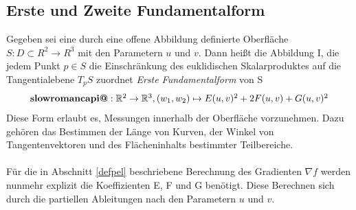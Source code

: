 \documentclass{paperStyle}
\makeatletter
\newcommand{\Rmnum}[1]{\textbf{\expandafter\@slowromancap\romannumeral #1@}}
\makeatother
\begin{document}
\subsection{Erste und Zweite Fundamentalform}
\label{fundamental}
Gegeben sei eine durch eine offene Abbildung definierte Oberfläche $S : D \subset R^{2} \longrightarrow R^{3}$ mit den Parametern $u$ und $v$. Dann heißt die Abbildung I, die jedem Punkt $p \in S$ die Einschränkung des euklidischen Skalarproduktes auf die Tangentialebene $T_{p}S$ zuordnet \textit{Erste Fundamentalform} von S
\begin{equation}
\resizebox{.9\hsize}{!}{$
\Rmnum{1}: \mathbb{R}^{2} \rightarrow \mathbb{R}^{3}, (w_{1},w_{2}) \mapsto E(u,v)^{2} + 2F(u,v) + G(u,v)^{2}$}
\end{equation}	
Diese Form erlaubt es, Messungen innerhalb der Oberfläche vorzunehmen. Dazu gehören das Bestimmen der Länge von Kurven, der Winkel von Tangentenvektoren und des Flächeninhalts bestimmter Teilbereiche.
\\
\\
Für die in Abschnitt \ref{defpel} beschriebene Berechnung des Gradienten $\nabla f$ werden nunmehr explizit die Koeffizienten E, F und G benötigt. Diese Berechnen sich durch die partiellen Ableitungen nach den Parametern $u$ und $v$.
\end{document}
